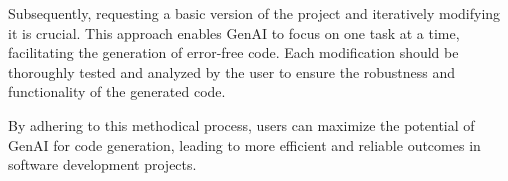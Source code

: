 \documentclass{article}
\begin{document}
Subsequently, requesting a basic version of the project and iteratively modifying it is crucial. This approach enables GenAI to focus on one task at a time, facilitating the generation of error-free code. Each modification should be thoroughly tested and analyzed by the user to ensure the robustness and functionality of the generated code.

By adhering to this methodical process, users can maximize the potential of GenAI for code generation, leading to more efficient and reliable outcomes in software development projects.
\end{document}
